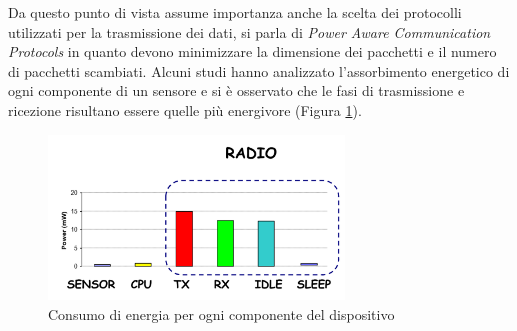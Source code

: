 	Da questo punto di vista assume importanza anche la scelta dei protocolli utilizzati per la trasmissione dei dati, si parla di \emph{Power Aware Communication Protocols} in quanto devono minimizzare la dimensione dei pacchetti e il numero di pacchetti scambiati.
	Alcuni studi hanno analizzato l'assorbimento energetico di ogni componente di un sensore e si è osservato che le fasi di trasmissione e ricezione risultano essere quelle più energivore (Figura \ref{fig:consumoEnergiaDispositivo}).
	
	\begin{figure}
		\centering
		\includegraphics[width=0.7\textwidth]{lez3-progettazione/img/consumoEnergiaDispositivo.png}
		\caption{Consumo di energia per ogni componente del dispositivo}
		\label{fig:consumoEnergiaDispositivo}
	\end{figure}
	
	
	
	
	